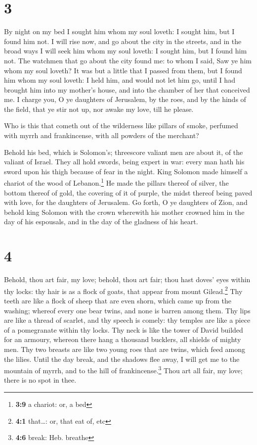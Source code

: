 \hypertarget{section-2}{%
\section{3}\label{section-2}}

 By night on my bed I sought him whom my soul loveth: I
sought him, but I found him not.  I will rise now, and go
about the city in the streets, and in the broad ways I will seek him
whom my soul loveth: I sought him, but I found him not. 
The watchmen that go about the city found me: to whom I said, Saw ye him
whom my soul loveth?  It was but a little that I passed
from them, but I found him whom my soul loveth: I held him, and would
not let him go, until I had brought him into my mother's house, and into
the chamber of her that conceived me.  I charge you, O ye
daughters of Jerusalem, by the roes, and by the hinds of the field, that
ye stir not up, nor awake my love, till he please.

 Who is this that cometh out of the wilderness like
pillars of smoke, perfumed with myrrh and frankincense, with all powders
of the merchant?

 Behold his bed, which is Solomon's; threescore valiant
men are about it, of the valiant of Israel.  They all hold
swords, being expert in war: every man hath his sword upon his thigh
because of fear in the night.  King Solomon made himself a
chariot of the wood of Lebanon.\footnote{\textbf{3:9} a chariot: or, a
  bed}  He made the pillars thereof of silver, the bottom
thereof of gold, the covering of it of purple, the midst thereof being
paved with love, for the daughters of Jerusalem.  Go
forth, O ye daughters of Zion, and behold king Solomon with the crown
wherewith his mother crowned him in the day of his espousals, and in the
day of the gladness of his heart.

\hypertarget{section-3}{%
\section{4}\label{section-3}}

 Behold, thou art fair, my love; behold, thou art fair;
thou hast doves' eyes within thy locks: thy hair is as a flock of goats,
that appear from mount Gilead.\footnote{\textbf{4:1} that\ldots: or,
  that eat of, etc}  Thy teeth are like a flock of sheep
that are even shorn, which came up from the washing; whereof every one
bear twins, and none is barren among them.  Thy lips are
like a thread of scarlet, and thy speech is comely: thy temples are like
a piece of a pomegranate within thy locks.  Thy neck is
like the tower of David builded for an armoury, whereon there hang a
thousand bucklers, all shields of mighty men.  Thy two
breasts are like two young roes that are twins, which feed among the
lilies.  Until the day break, and the shadows flee away, I
will get me to the mountain of myrrh, and to the hill of
frankincense.\footnote{\textbf{4:6} break: Heb. breathe} 
Thou art all fair, my love; there is no spot in thee.

